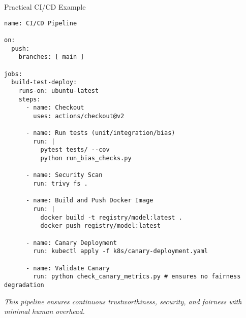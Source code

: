 \documentclass[aspectratio=169]{beamer}
\begin{document}
%
%
%
%
\begin{frame}{Practical CI/CD Example}
\begin{verbatim}
name: CI/CD Pipeline

on:
  push:
    branches: [ main ]

jobs:
  build-test-deploy:
    runs-on: ubuntu-latest
    steps:
      - name: Checkout
        uses: actions/checkout@v2

      - name: Run tests (unit/integration/bias)
        run: |
          pytest tests/ --cov
          python run_bias_checks.py

      - name: Security Scan
        run: trivy fs .

      - name: Build and Push Docker Image
        run: |
          docker build -t registry/model:latest .
          docker push registry/model:latest

      - name: Canary Deployment
        run: kubectl apply -f k8s/canary-deployment.yaml

      - name: Validate Canary
        run: python check_canary_metrics.py # ensures no fairness degradation
\end{verbatim}

\emph{This pipeline ensures continuous trustworthiness, security, and fairness with minimal human overhead.}
\end{frame}
\end{document}
